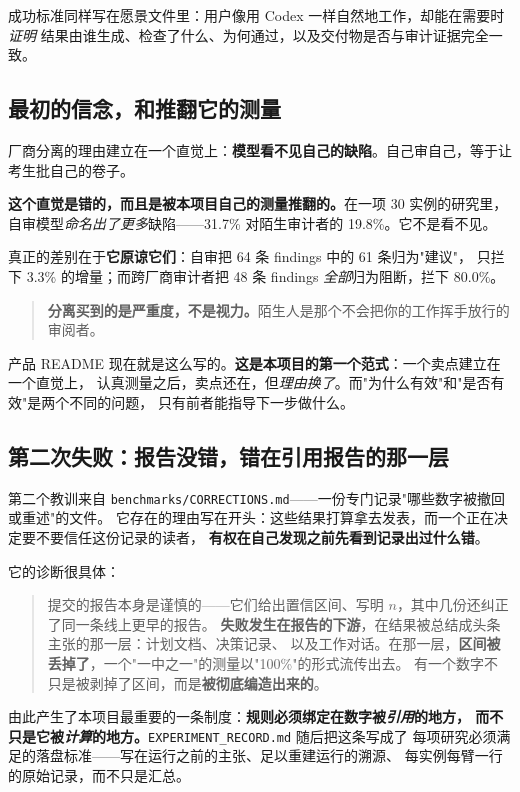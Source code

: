 \documentclass[11pt,a4paper]{article}
\begin{document}
成功标准同样写在愿景文件里：用户像用 Codex 一样自然地工作，却能在需要时\emph{证明}
结果由谁生成、检查了什么、为何通过，以及交付物是否与审计证据完全一致。

\subsection{最初的信念，和推翻它的测量}

厂商分离的理由建立在一个直觉上：\textbf{模型看不见自己的缺陷}。自己审自己，等于让考生批自己的卷子。

\textbf{这个直觉是错的，而且是被本项目自己的测量推翻的。}在一项 30 实例的研究里，
自审模型\emph{命名出了更多}缺陷——31.7\% 对陌生审计者的 19.8\%。它不是看不见。

真正的差别在于\textbf{它原谅它们}：自审把 64 条 findings 中的 61 条归为"建议"，
只拦下 3.3\% 的增量；而跨厂商审计者把 48 条 findings \emph{全部}归为阻断，拦下 80.0\%。

\begin{quote}
\textbf{分离买到的是严重度，不是视力。}陌生人是那个不会把你的工作挥手放行的审阅者。
\end{quote}

产品 README 现在就是这么写的。\textbf{这是本项目的第一个范式}：一个卖点建立在一个直觉上，
认真测量之后，卖点还在，但\emph{理由换了}。而"为什么有效"和"是否有效"是两个不同的问题，
只有前者能指导下一步做什么。

\subsection{第二次失败：报告没错，错在引用报告的那一层}

第二个教训来自 \texttt{benchmarks/CORRECTIONS.md}——一份专门记录"哪些数字被撤回或重述"的文件。
它存在的理由写在开头：这些结果打算拿去发表，而一个正在决定要不要信任这份记录的读者，
\textbf{有权在自己发现之前先看到记录出过什么错}。

它的诊断很具体：

\begin{quote}
提交的报告本身是谨慎的——它们给出置信区间、写明 $n$，其中几份还纠正了同一条线上更早的报告。
\textbf{失败发生在报告的下游}，在结果被总结成头条主张的那一层：计划文档、决策记录、
以及工作对话。在那一层，\textbf{区间被丢掉了}，一个"一中之一"的测量以"100\%"的形式流传出去。
有一个数字不只是被剥掉了区间，而是\textbf{被彻底编造出来的}。
\end{quote}

由此产生了本项目最重要的一条制度：\textbf{规则必须绑定在数字被\emph{引用}的地方，
而不只是它被\emph{计算}的地方。}\texttt{EXPERIMENT\_RECORD.md} 随后把这条写成了
每项研究必须满足的落盘标准——写在运行之前的主张、足以重建运行的溯源、
每实例每臂一行的原始记录，而不只是汇总。
\end{document}
